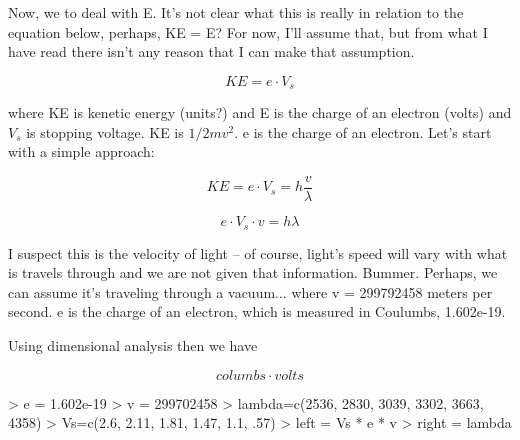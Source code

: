 \documentclass{article}
\begin{document}
Now, we to deal with E. It's not clear what this is really in relation to the equation below, perhaps, KE = E? For now, I'll assume that, but from what I have read there isn't any reason that I can make that assumption.

\begin{equation}
KE = e \cdot V_s 
\end{equation}

\noindent where KE is kenetic energy (units?) and E is the charge of an electron (volts) and $V_s$ is stopping voltage. KE is $1/2 mv^2$. e is the charge of an electron. Let's start with a simple approach:

\begin{equation}
KE = e \cdot V_s = h \frac{v}{\lambda}
\end{equation}
 
\begin{equation}
e \cdot V_s \cdot v = h \lambda
\end{equation}

I suspect this is the velocity of light -- of course, light's speed will vary with what is travels through and we are not given that information. Bummer. Perhaps, we can assume it's traveling through a vacuum... where v = 299792458 meters per second. e is the charge of an electron, which is measured in Coulumbs, 1.602e-19. 

Using dimensional analysis then we have 

\begin{equation}
columbs \cdot volts
\end{equation}

\begin{Schunk}
\begin{Sinput}
> e = 1.602e-19
> v = 299702458
> lambda=c(2536, 2830, 3039, 3302, 3663, 4358)
> Vs=c(2.6, 2.11, 1.81, 1.47, 1.1, .57)
> left = Vs * e * v 
> right = lambda
\end{Sinput}
\end{Schunk}
\end{document}
